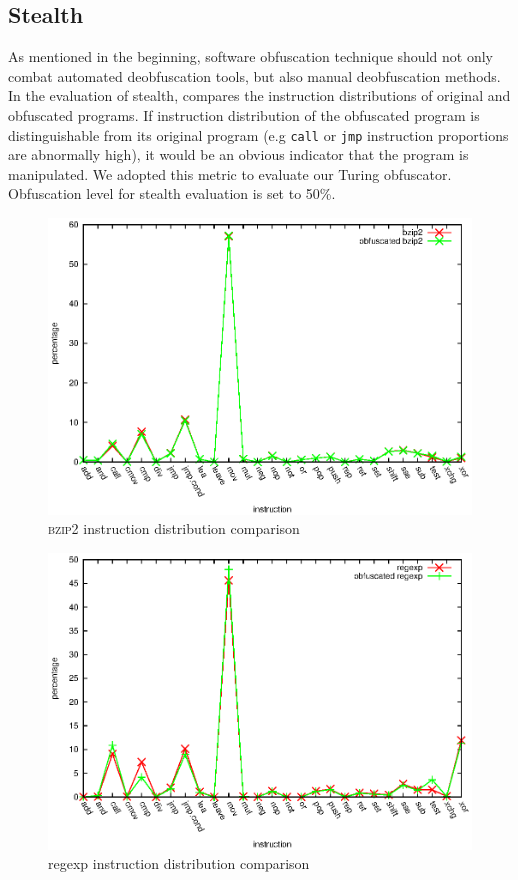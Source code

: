 \documentclass[lnicst]{svmultln}
\begin{document}
\subsection{Stealth}
As mentioned in the beginning, software obfuscation technique should not only
combat automated deobfuscation tools, but also manual deobfuscation methods. In
the evaluation of stealth, \cite{Trans} compares the instruction distributions
of original and obfuscated programs. If instruction distribution of the
obfuscated program is distinguishable from its original program (e.g
\texttt{call} or \texttt{jmp} instruction proportions are abnormally high), it
would be an obvious indicator that the program is manipulated. We adopted this
metric to evaluate our Turing obfuscator. Obfuscation level for stealth
evaluation is set to 50\%.

\begin{figure}
  \includegraphics[width=0.9\linewidth]{st_bzip2.eps}
  \caption{\textsc{bzip2} instruction distribution comparison}
  \label{fig:bzip2}
\end{figure}

\begin{figure}
  \includegraphics[width=0.9\linewidth]{st_regexp.eps}
  \caption{regexp instruction distribution comparison}
  \label{fig:regexp}
\end{figure}
\end{document}
